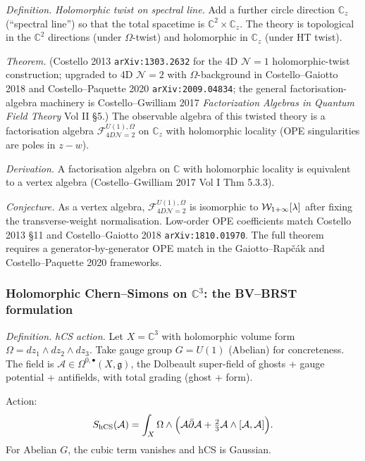 \emph{Definition.} \emph{Holomorphic twist on spectral line.}
Add a further circle direction $\mathbb{C}_z$ (``spectral line'') so that the
total spacetime is $\mathbb{C}^2 \times \mathbb{C}_z$. The theory is topological in the
$\mathbb{C}^2$ directions (under $\Omega$-twist) and holomorphic in $\mathbb{C}_z$ (under
HT twist).

\emph{Theorem.} (Costello 2013 \texttt{arXiv:1303.2632} for the 4D
$\mathcal{N} = 1$ holomorphic-twist construction; upgraded to 4D $\mathcal{N} = 2$ with
$\Omega$-background in Costello--Gaiotto 2018 and Costello--Paquette 2020
\texttt{arXiv:2009.04834}; the general factorisation-algebra machinery is
Costello--Gwilliam 2017 \emph{Factorization Algebras in Quantum Field Theory} Vol II §5.)
The observable algebra of this twisted theory is a factorisation algebra
$\mathcal{F}_{4D \mathcal{N} = 2}^{U(1), \Omega}$ on $\mathbb{C}_z$ with holomorphic
locality (OPE singularities are poles in $z - w$).

\emph{Derivation.} A factorisation algebra on $\mathbb{C}$ with holomorphic
locality is equivalent to a vertex algebra (Costello--Gwilliam 2017 Vol I Thm 5.3.3).

\emph{Conjecture.} As a vertex algebra,
$\mathcal{F}_{4D \mathcal{N} = 2}^{U(1), \Omega}$ is isomorphic to
$\mathcal{W}_{1+\infty}[\lambda]$ after fixing the transverse-weight normalisation.
Low-order OPE coefficients match Costello 2013 §11 and
Costello--Gaiotto 2018 \texttt{arXiv:1810.01970}. The full theorem
requires a generator-by-generator OPE match in the Gaiotto--Rapčák and
Costello--Paquette 2020 frameworks.

\subsubsection{Holomorphic Chern--Simons on $\mathbb{C}^3$: the BV--BRST formulation}
\label{wn:subsubsec:hCS-on-C3}

\emph{Definition.} \emph{hCS action.} Let $X = \mathbb{C}^3$ with holomorphic
volume form $\Omega = dz_1 \wedge dz_2 \wedge dz_3$. Take gauge group $G = U(1)$
(Abelian) for concreteness.
The field is $\mathcal{A} \in \Omega^{0, \bullet}(X, \mathfrak{g})$, the Dolbeault
super-field of ghosts + gauge potential + antifields, with total grading (ghost + form).

Action:
\[
S_{\mathrm{hCS}}(\mathcal{A}) = \int_X \Omega \wedge \Big( \mathcal{A} \bar\partial \mathcal{A}
+ \tfrac{2}{3} \mathcal{A} \wedge [\mathcal{A}, \mathcal{A}] \Big).
\]
For Abelian $G$, the cubic term vanishes and hCS is Gaussian.

